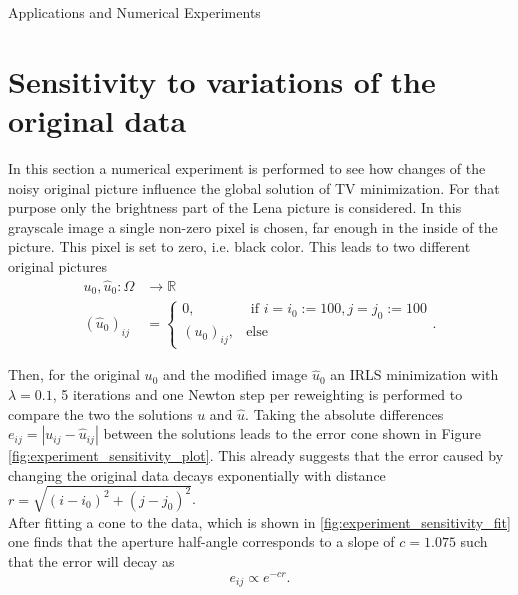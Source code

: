 \begin{chapter}{Applications and Numerical Experiments}
\section{Sensitivity to variations of the original data} %
\label{sec:Sensitivity}
In this section a numerical experiment is performed to see how changes of the noisy original picture influence the global solution of TV
minimization.
For that purpose only the brightness part of the Lena picture is considered. In this grayscale image a single non-zero pixel is chosen, far enough in the inside of the picture. This pixel is set to zero, i.e. black color. This leads to two different original pictures
\begin{align}
    u_0,\hat{u}_0:\Omega &\to\mathbb{R}\\
    (\hat{u}_0)_{ij}&=\begin{cases}
	0, & \text{ if } i=i_0:=100,j=j_0:=100\\
	(u_0)_{ij}, &\text{else}
    \end{cases}.
\end{align}

Then, for the original $u_0$ and the modified image $\hat{u}_0$ an IRLS minimization with $\lambda=0.1$, 5 iterations and one Newton step per reweighting is
performed to compare the two the solutions $u$ and $\hat{u}$. Taking the absolute differences $e_{ij}=|u_{ij}-\hat{u}_{ij}|$ between the solutions
leads to the error cone shown in Figure \ref{fig:experiment_sensitivity_plot}. This already suggests that the
error caused by changing the original data decays exponentially with distance $r=\sqrt{(i-i_0)^{2}+(j-j_0)^{2}}$.\\

After fitting a cone to the data, which is shown in \ref{fig:experiment_sensitivity_fit}
one finds that the aperture half-angle corresponds to a slope of $c=1.075$ such that the error will decay as
\begin{equation}
    e_{ij}\propto e^{-cr}.
\end{equation}


\end{chapter}
